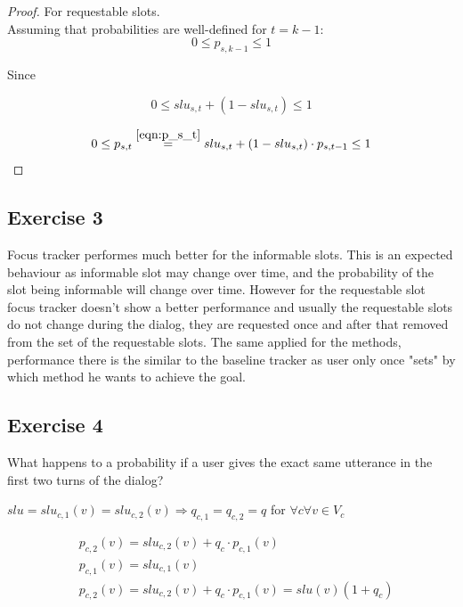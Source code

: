\documentclass[12pt,titlepage,a4paper]{article}
\begin{document}
\begin{proof}
    For requestable slots.\\
    
    Assuming that probabilities are well-defined for $t = k-1$:
    \begin{equation}
        0 \leq p_{s,k-1} \leq 1
    \end{equation}
    
    Since
    
    \begin{equation}
        0 \leq slu_{s,t} + (1 - slu_{s,t}) \leq 1
    \end{equation}

    \begin{equation}
        0 \leq p_{s,t} \overset{\ref{eqn:p_s_t}}{=} slu_{s,t} + (1 - slu_{s,t}) \cdot p_{s,t-1} \leq 1
    \end{equation}
\end{proof}

\subsection{Exercise 3}
Focus tracker performes much better for the informable slots. This is an expected behaviour as informable slot may change over time, and the probability of the slot being informable will change over time. However for the requestable slot focus tracker doesn't show a better performance and usually the requestable slots do not change during the dialog, they are requested once and after that removed from the set of the requestable slots. The same applied for the methods, performance there is the similar to the baseline tracker as user only once "sets" by which method he wants to achieve the goal.

\subsection{Exercise 4}
What happens to a probability if a user gives the exact same utterance in
the first two turns of the dialog?

$slu = slu_{c, 1}(v) = slu_{c,2}(v) \Rightarrow q_{c,1} = q_{c, 2} = q$ for $\forall c \forall v \in V_c $

\begin{equation}
    \begin{aligned}
        &p_{c,2}(v) = slu_{c,2}(v) + q_c \cdot p_{c, 1}(v) 
        \\
        &p_{c,1}(v) = slu_{c,1}(v)
        \\
        &p_{c, 2}(v) = slu_{c,2}(v) + q_c \cdot p_{c, 1}(v) = slu(v)(1 + q_c)
    \end{aligned}
\end{equation}
\end{document}
